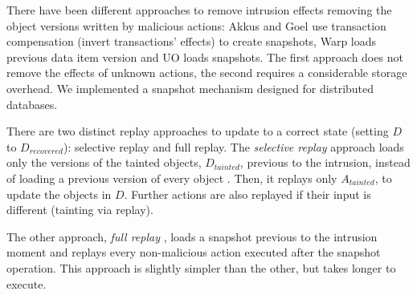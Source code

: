 There have been different approaches to remove intrusion effects removing the object versions written by malicious actions: Akkus and Goel \cite{Akkus2010} use transaction compensation (invert transactions' effects) to create snapshots, Warp loads previous data item version and UO loads snapshots. The first approach does not remove the effects of unknown actions, the second requires a considerable storage overhead. We implemented a snapshot mechanism designed for distributed databases. %


There are two distinct replay approaches to update to a correct state (setting $D$ to $D_{recovered}$): selective replay and full replay. 
The \textit{selective replay} approach loads only the versions of the tainted objects, $D_{tainted}$, previous to the intrusion, instead of loading a previous version of every object \cite{taser,warp,Akkus2010}. Then, it replays only $A_{tainted}$, to update the objects in $D$. Further actions are also replayed if their input is different (tainting via replay). 

The other approach, \textit{full replay} \cite{undoForOperators}, loads a snapshot previous to the intrusion moment and replays every non-malicious action executed after the snapshot operation. This approach is slightly simpler than the other, but takes longer to execute.  


